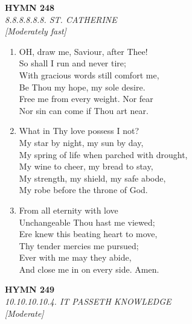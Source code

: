 \documentclass[11pt,a4paper]{article}
\begin{document}
\newpage
\begin{center}
    {\Large \textbf{HYMN 248}}
    \\
    \textit{8.8.8.8.8.8. ST. CATHERINE}
    \\
    \textit{\small [Moderately fast]}
\end{center}
\vspace{1em}

\begin{enumerate}
    \item OH, draw me, Saviour, after Thee! \\
        So shall I run and never tire; \\
        With gracious words still comfort me, \\
        Be Thou my hope, my sole desire. \\
        Free me from every weight. Nor fear \\
        Nor sin can come if Thou art near.

    \item What in Thy love possess I not? \\
        My star by night, my sun by day, \\
        My spring of life when parched with drought, \\
        My wine to cheer, my bread to stay, \\
        My strength, my shield, my safe abode, \\
        My robe before the throne of God.

    \item From all eternity with love \\
        Unchangeable Thou hast me viewed; \\
        Ere knew this beating heart to move, \\
        Thy tender mercies me pursued; \\
        Ever with me may they abide, \\
        And close me in on every side. Amen.

\end{enumerate}

\newpage
\begin{center}
    {\Large \textbf{HYMN 249}}
    \\
    \textit{10.10.10.10.4. IT PASSETH KNOWLEDGE}
    \\
    \textit{\small [Moderate]}
\end{center}
\vspace{1em}
\end{document}
